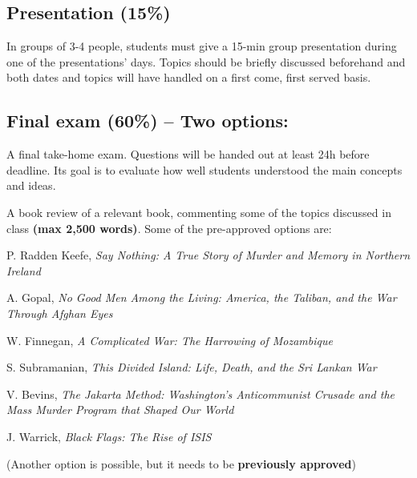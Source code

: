 \documentclass[12pt, a4paper]{article}
\begin{document}
\subsection*{Presentation (15\%)}

In groups of 3-4 people, students must give a 15-min group presentation during one of the presentations’ days.
Topics should be briefly discussed beforehand and both dates and topics will have handled on a first come, first served basis.

\subsection*{Final exam (60\%) -- Two options:}

\begin{itemize}
  \item[\textbf{A.}] A final take-home exam. Questions will be handed out at least 24h before deadline. Its goal is to evaluate how well students understood the main concepts and ideas.
  \item[\textbf{B.}] A book review of a relevant book, commenting some of the topics discussed in class \textbf{(max 2,500 words)}. Some of the pre-approved options are:
  {\small
  \item[-] P. Radden Keefe, \textit{Say Nothing: A True Story of Murder and Memory in Northern Ireland} \vspace{-10pt}
  \item[-] A. Gopal, \textit{No Good Men Among the Living: America, the Taliban, and the War Through Afghan Eyes} \vspace{-10pt}
  \item[-] W. Finnegan, \textit{A Complicated War: The Harrowing of Mozambique} \vspace{-10pt}
  \item[-] S. Subramanian, \textit{This Divided Island: Life, Death, and the Sri Lankan War} \vspace{-10pt}
  \item[-] V. Bevins, \textit{The Jakarta Method: Washington's Anticommunist Crusade and the Mass Murder Program that Shaped Our World} \vspace{-10pt}
  \item[-] J. Warrick, \textit{Black Flags: The Rise of ISIS}
  }
  \item[] (Another option is possible, but it needs to be \textbf{previously approved})
\end{itemize}
\end{document}
